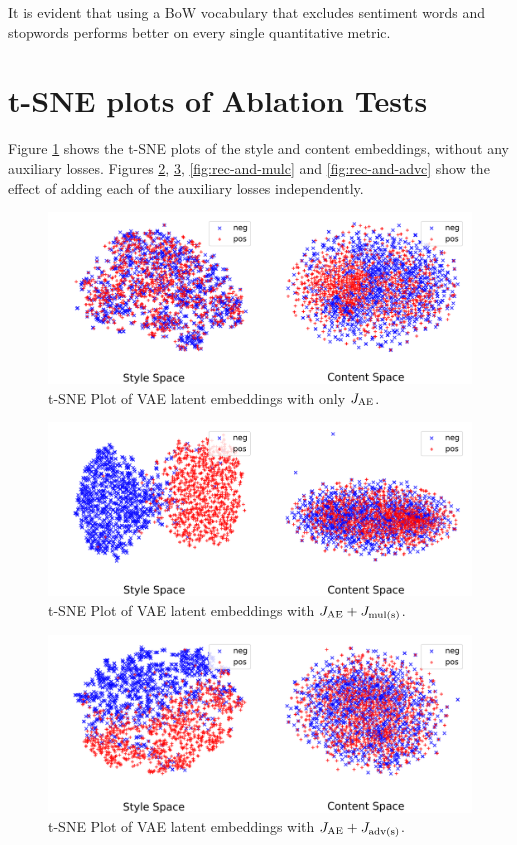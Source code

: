 \documentclass[letterpaper]{article}
\begin{document}
It is evident that using a BoW vocabulary that excludes sentiment words and stopwords performs better on every single quantitative metric.


\section{t-SNE plots of Ablation Tests}

Figure \ref{fig:only-rec} shows the t-SNE plots of the style and content embeddings, without any auxiliary losses.
Figures \ref{fig:rec-and-muls}, \ref{fig:rec-and-advs}, \ref{fig:rec-and-mulc} and \ref{fig:rec-and-advc} show the effect of adding each of the auxiliary losses independently.

\begin{figure}[ht]
	\includegraphics[width=\linewidth]{vae-latent-spaces-only-rec}
	\caption{t-SNE Plot of VAE latent embeddings with only $J_{\text{AE}}$.}
	\label{fig:only-rec}
\end{figure}

\begin{figure}[ht]
	\includegraphics[width=\linewidth]{vae-latent-spaces-rec-muls}
	\caption{t-SNE Plot of VAE latent embeddings with $J_{\text{AE}} + J_{\text{mul(s)}}$.}
	\label{fig:rec-and-muls}
\end{figure}

\begin{figure}[ht]
	\includegraphics[width=\linewidth]{vae-latent-spaces-rec-advs}
	\caption{t-SNE Plot of VAE latent embeddings with $J_{\text{AE}} + J_{\text{adv(s)}}$.}
	\label{fig:rec-and-advs}
\end{figure}
\end{document}
